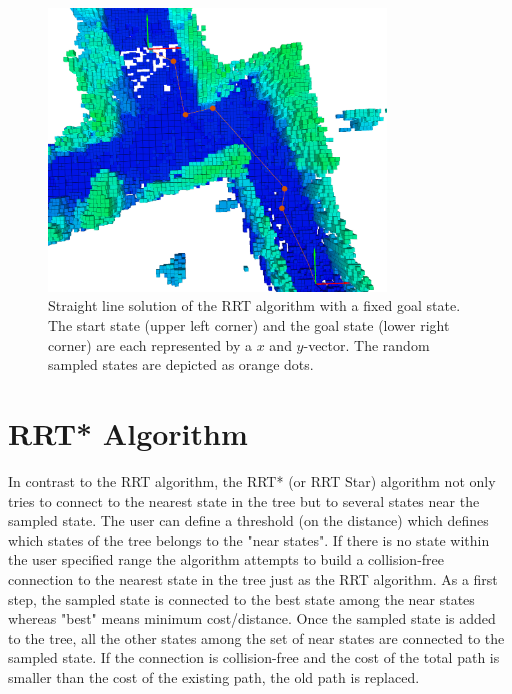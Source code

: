 \begin{figure}[H]
   \centering
   \includegraphics[trim = 50mm 0mm 30mm 0mm,clip,width=0.8\textwidth]{pics/smallGammaP.png}
   \caption{Straight line solution of the RRT algorithm with a fixed goal state. The start state (upper left corner) and the goal state (lower right corner) are each represented by a $x$ and  $y$-vector. The random sampled states are depicted as orange dots.}
   \label{pic:smallGamma}
\end{figure}



\section{RRT* Algorithm}\label{sec:RRTstar}

In contrast to the RRT algorithm, the RRT* (or RRT Star) algorithm not only tries to connect to the nearest state in the tree but to several states near the sampled state. The user can define a threshold (on the distance) which defines which states of the tree belongs to the "near states". If there is no state within the user specified range the algorithm attempts to build a collision-free connection to the nearest state in the tree just as the RRT algorithm.  \newline
As a first step, the sampled state is connected to the best state among the near states whereas "best" means minimum cost/distance. Once the sampled state is added to the tree, all the other states among the set of near states are connected to the sampled state. If the connection is collision-free and the cost of the total path is smaller than the cost of the existing path, the old path is replaced. \newline

